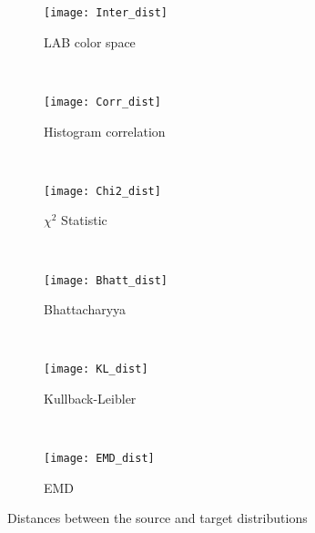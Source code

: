 \begin{figure}[!ht]
    \centering
    \begin{subfigure}[b]{0.3\textwidth}
		\centering
		\texttt{[image: Inter\_dist]}	
		\caption{LAB color space}
        \label{fig:inter_dist}
	\end{subfigure}
	~ %
    \begin{subfigure}[b]{0.3\textwidth}
		\centering
		\texttt{[image: Corr\_dist]}	
		\caption{Histogram correlation}
        \label{fig:corr_dist}
	\end{subfigure}
    ~ %
    \begin{subfigure}[b]{0.3\textwidth}
		\centering
		\texttt{[image: Chi2\_dist]}	
		\caption{$\chi^2$ Statistic}
        \label{fig:chi_square}
	\end{subfigure}  \\[2ex]
	
	
	\begin{subfigure}[b]{0.3\textwidth}
		\centering
		\texttt{[image: Bhatt\_dist]}	
		\caption{Bhattacharyya}
        \label{fig:bhatt_dist}
	\end{subfigure}
	~ %
    \begin{subfigure}[b]{0.3\textwidth}
		\centering
		\texttt{[image: KL\_dist]}	
		\caption{Kullback-Leibler}
        \label{fig:kl_div}
	\end{subfigure}
    ~ %
    \begin{subfigure}[b]{0.3\textwidth}
		\centering
		\texttt{[image: EMD\_dist]}	
		\caption{EMD}
        \label{fig:emd}
	\end{subfigure}
   
   \caption{Distances between the source and target distributions}
   \label{fig:distances}
\end{figure}


